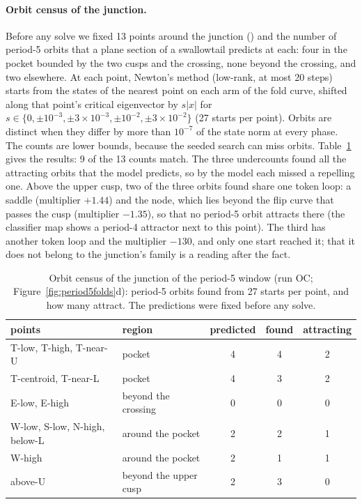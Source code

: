 \documentclass[11pt,letterpaper]{article}
\begin{document}
\paragraph{Orbit census of the junction.} Before any solve we fixed 13 points around the junction
() and the number of period-5 orbits that a plane section of a swallowtail predicts at
each: four in the pocket bounded by the two cusps and the crossing, none beyond the crossing, and two elsewhere. At each
point, Newton's method (low-rank, at most 20 steps) starts from the states of the nearest point on each arm of the
fold curve, shifted along that point's critical eigenvector by $s\lvert x\rvert$ for
$s\in\{0,\pm10^{-3},\pm3\times10^{-3},\pm10^{-2},\pm3\times10^{-2}\}$ (27 starts per point). Orbits are distinct when
they differ by more than $10^{-7}$ of the state norm at every phase. The counts are lower bounds, because the seeded
search can miss orbits.
Table~\ref{tab:census} gives the results: 9 of the 13 counts match. The three undercounts found all the attracting
orbits that the model predicts, so by the model each missed a repelling one.
Above the upper cusp, two of the three orbits found share one token loop: a saddle (multiplier $+1.44$) and the node,
which lies beyond the flip curve that passes the cusp (multiplier $-1.35$), so that no period-5 orbit attracts
there (the classifier map shows a period-4 attractor next to this point). The third
has another token loop and the multiplier $-130$, and only one start reached it; that it does not belong to the
junction's family is a reading after the fact.
\begin{table}[tbp]
\centering\small
\begin{tabular}{llccc}
\toprule
points & region & predicted & found & attracting \\
\midrule
T-low, T-high, T-near-U & pocket & 4 & 4 & 2 \\
T-centroid, T-near-L & pocket & 4 & 3 & 2 \\
E-low, E-high & beyond the crossing & 0 & 0 & 0 \\
W-low, S-low, N-high, below-L & around the pocket & 2 & 2 & 1 \\
W-high & around the pocket & 2 & 1 & 1 \\
above-U & beyond the upper cusp & 2 & 3 & 0 \\
\bottomrule
\end{tabular}
\caption{Orbit census of the junction of the period-5 window (run OC; Figure~\ref{fig:period5folds}d): period-5
orbits found from 27 starts per point, and how many attract. The predictions were fixed before any solve.}
\label{tab:census}
\end{table}
\end{document}
